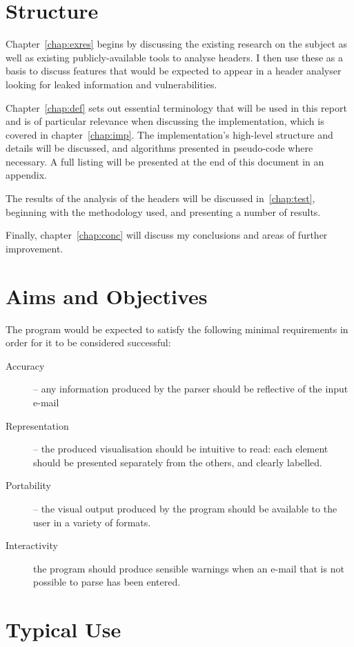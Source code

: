 \documentclass[twoside,10pt]{scrreprt}
\begin{document}
\section{Structure}
Chapter~\ref{chap:exres} begins by discussing the existing research on the subject as well as existing publicly-available tools to analyse headers.  I then use these as a basis to discuss features that would be expected to appear in a header analyser looking for leaked information and vulnerabilities.

Chapter~\ref{chap:def} sets out essential terminology that will be used in this report and is of particular relevance when discussing the implementation, which is covered in chapter~\ref{chap:imp}.  The implementation's high-level structure and details will be discussed, and algorithms presented in pseudo-code where necessary.  A full listing will be presented at the end of this document in an appendix.

The results of the analysis of the headers will be discussed in~\ref{chap:test}, beginning with the methodology used, and presenting a number of results.

Finally, chapter~\ref{chap:conc} will discuss my conclusions and areas of further improvement.

\section{Aims and Objectives}

The program would be expected to satisfy the following minimal requirements in order for it to be considered successful: 
\begin{description}
\item [{Accuracy}]  -- any information produced by the parser should be reflective of the input e-mail
\item [{Representation}] -- the produced visualisation should be intuitive to read: each element should be presented separately from the others, and clearly labelled. 
\item [{Portability}] -- the visual output produced by the program should be available to the user in a variety of formats. 
\item [{Interactivity}] the program should produce sensible warnings when
an e-mail that is not possible to parse has been entered. 
\end{description}

\section{Typical Use}
\end{document}
